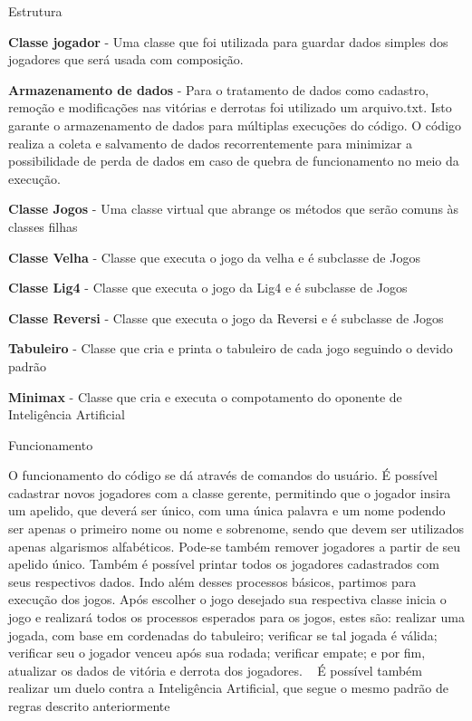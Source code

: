 Estrutura
\begin{DoxyItemize}
\item 
\begin{DoxyItemize}
\item {\bfseries{Classe jogador}} -\/ Uma classe que foi utilizada para guardar dados simples dos jogadores que será usada com composição.
\item {\bfseries{Armazenamento de dados}} -\/ Para o tratamento de dados como cadastro, remoção e modificações nas vitórias e derrotas foi utilizado um arquivo.\+txt. Isto garante o armazenamento de dados para múltiplas execuções do código. O código realiza a coleta e salvamento de dados recorrentemente para minimizar a possibilidade de perda de dados em caso de quebra de funcionamento no meio da execução.
\item {\bfseries{Classe Jogos}} -\/ Uma classe virtual que abrange os métodos que serão comuns às classes filhas
\begin{DoxyItemize}
\item {\bfseries{Classe Velha}} -\/ Classe que executa o jogo da velha e é subclasse de Jogos
\item {\bfseries{Classe Lig4}} -\/ Classe que executa o jogo da Lig4 e é subclasse de Jogos
\item {\bfseries{Classe Reversi}} -\/ Classe que executa o jogo da Reversi e é subclasse de Jogos
\end{DoxyItemize}
\item {\bfseries{Tabuleiro}} -\/ Classe que cria e printa o tabuleiro de cada jogo seguindo o devido padrão
\item {\bfseries{Minimax}} -\/ Classe que cria e executa o compotamento do oponente de Inteligência Artificial
\end{DoxyItemize}
\end{DoxyItemize}

Funcionamento
\begin{DoxyItemize}
\item O funcionamento do código se dá através de comandos do usuário. É possível cadastrar novos jogadores com a classe gerente, permitindo que o jogador insira um apelido, que deverá ser único, com uma única palavra e um nome podendo ser apenas o primeiro nome ou nome e sobrenome, sendo que devem ser utilizados apenas algarismos alfabéticos. Pode-\/se também remover jogadores a partir de seu apelido único. Também é possível printar todos os jogadores cadastrados com seus respectivos dados. Indo além desses processos básicos, partimos para execução dos jogos. Após escolher o jogo desejado sua respectiva classe inicia o jogo e realizará todos os processos esperados para os jogos, estes são\+: realizar uma jogada, com base em cordenadas do tabuleiro; verificar se tal jogada é válida; verificar seu o jogador venceu após sua rodada; verificar empate; e por fim, atualizar os dados de vitória e derrota dos jogadores. ~\newline
 É possível também realizar um duelo contra a Inteligência Artificial, que segue o mesmo padrão de regras descrito anteriormente
\end{DoxyItemize}

